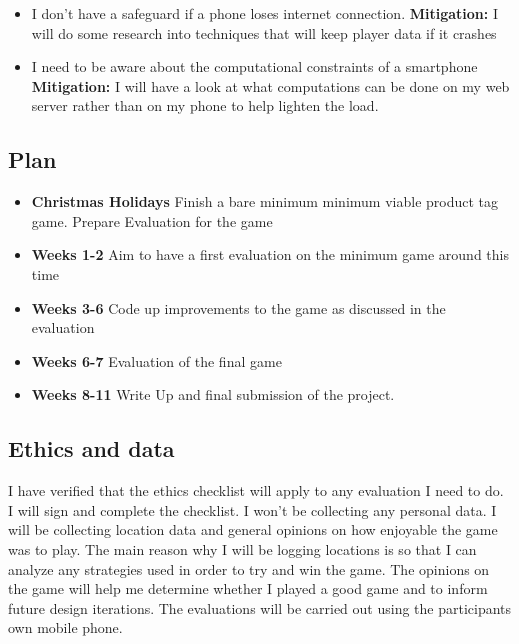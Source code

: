 \documentclass[11pt]{article}
\begin{document}
\begin{itemize}
    \tightlist
    \item I don't have a safeguard if a phone loses internet connection. \textbf{Mitigation:} I will do some research into techniques that will keep player data if it crashes
    \item I need to be aware about the computational constraints of a smartphone \textbf{Mitigation:} I will have a look at what computations can be done on my web server rather than on my phone to help lighten the load.
\end{itemize}

\subsection{Plan}\label{plan}

\begin{itemize}
    \tightlist
    \item \textbf{Christmas Holidays} Finish a bare minimum minimum viable product tag game. Prepare Evaluation for the game
    \item \textbf{Weeks 1-2} Aim to have a first evaluation on the minimum game around this time
    \item \textbf{Weeks 3-6} Code up improvements to the game as discussed in the evaluation
    \item \textbf{Weeks 6-7} Evaluation of the final game
    \item \textbf{Weeks 8-11} Write Up and final submission of the project.
\end{itemize}


    
\subsection{Ethics and data}\label{ethics}

I have verified that the ethics checklist will apply to any evaluation I need to do. I will sign and complete the checklist. I won't be collecting any personal
data. I will be collecting location data and general opinions on how enjoyable the game was to play. The main reason why I will be logging locations is so that
I can analyze any strategies used in order to try and win the game. The opinions on the game will help me determine whether I played a good game and to inform
future design iterations. The evaluations will be carried out using the participants own mobile phone.
   
\end{document}
